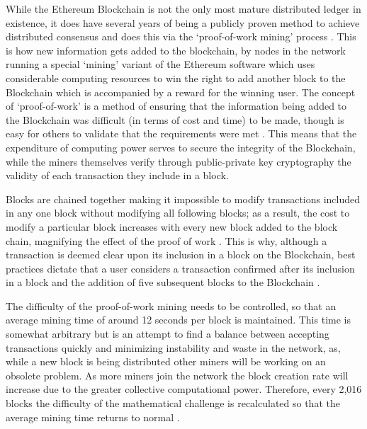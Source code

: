 \documentclass{article}
\begin{document}
While the Ethereum Blockchain is not the only most mature distributed ledger in existence, it does have several years of being a publicly proven method to achieve distributed consensus and does this via the `proof-of-work mining' process \citep{24_distributed_ledgers_and_blockchain_technology_2016}. This is how new information gets added to the blockchain, by nodes in the network running a special `mining' variant of the Ethereum software which uses considerable computing resources to win the right to add another block to the Blockchain which is accompanied by a reward for the winning user. The concept of `proof-of-work' is a method of ensuring that the information being added to the Blockchain was difficult (in terms of cost and time) to be made, though is easy for others to validate that the requirements were met \citep{26_blockchain_mining_-_distributed_ledgers_and_blockchain_technology_2016}. This means that the expenditure of computing power serves to secure the integrity of the Blockchain, while the miners themselves verify through public-private key cryptography the validity of each transaction they include in a block.

Blocks are chained together making it impossible to modify transactions included in any one block without modifying all following blocks; as a result, the cost to modify a particular block increases with every new block added to the block chain, magnifying the effect of the proof of work \citep{20_developer_guide_bitcoin_2016}\citep{38_proof_of_work_-_masterpage_2016}. This is why, although a transaction is deemed clear upon its inclusion in a block on the Blockchain, best practices dictate that a user considers a transaction confirmed after its inclusion in a block and the addition of five subsequent blocks to the Blockchain \citep{27_confirmation_-_bitcoin_wiki_2016}.

The difficulty of the proof-of-work mining needs to be controlled, so that an average mining time of around 12 seconds per block is maintained. This time is somewhat arbitrary but is an attempt to find a balance between accepting transactions quickly and minimizing instability and waste in the network, as, while a new block is being distributed other miners will be working on an obsolete problem. As more miners join the network the block creation rate will increase due to the greater collective computational power. Therefore, every 2,016 blocks the difficulty of the mathematical challenge is recalculated so that the average mining time returns to normal \citep{20_developer_guide_bitcoin_2016}\citep{26_blockchain_mining_-_distributed_ledgers_and_blockchain_technology_2016}.
\end{document}
